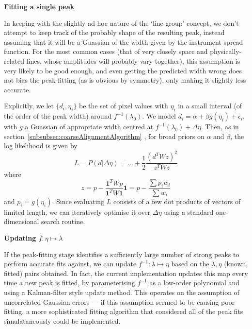 \vspace{1em}


{\bf{Fitting a single peak}}

\vspace{1em}

In keeping with the slightly ad-hoc nature of the `line-group' concept,
we don't attempt to keep track of the probably shape of the resulting
peak, instead assuming that it will be a Guassian of the width given
by the instrument spread function. For the most common cases (that of
very closely space and physically-related lines, whose amplitudes will
probably vary together), this assumption is very likely to be good
enough, and even getting the predicted width wrong does not bias the
peak-fitting (as is obvious by symmetry), only making it slightly less
accurate.

Explicitly, we let $\{d_i, \eta_i\}$ be the set of pixel values
with $\eta_i$ in a small interval (of the order of the peak
width) around $f^{-1}(\lambda_0)$. We model $d_i = \alpha + \beta
g(\eta_i) + \epsilon_i$, with $g$ a Guassian of appropriate
width centred at $f^{-1}(\lambda_0) + \Delta\eta$. Then, as in
section~\ref{subsubsec:coarseAlignmentAlgorithm} , for broad priors on
$\alpha$ and $\beta$, the log likelihood is given by
\[
L = P(d|\Delta\eta) = \dots + \frac{1}{2} \frac{(d^T W z)^2}{z^T W z}
\]
where
\[
z = p - \frac{\mathbf{1}^T W p}{\mathbf{1}^T W \mathbf{1}} \mathbf{1}
= p - \frac{\sum p_i w_i}{\sum w_i}
\]
and $p_i = g(\eta_i)$. Since evaluating $L$ consists of a few dot
products of vectors of limited length, we can iteratively optimise it
over $\Delta\eta$ using a standard one-dimensional search routine.

\vspace{1em}

{\bf{Updating $f : \eta \mapsto \lambda$}}

\vspace{1em}

If the peak-fitting stage identifies a sufficiently large number of
strong peaks to perform accurate fits against, we can update $f^{-1} : \lambda \mapsto
\eta$ based on the $\lambda, \eta$ (known, fitted) pairs obtained.
In fact, the current implementation updates this map every time a new peak
is fitted, by parameterising $f^{-1}$ as a low-order polynomial and using
a Kalman-filter style update method. This operates on the assumption of
uncorrelated Gaussian errors --- if this assumption seemed to be causing
poor fitting, a more sophisticated fitting algorithm that considered all
of the peak fits simulataneously could be implemented.


